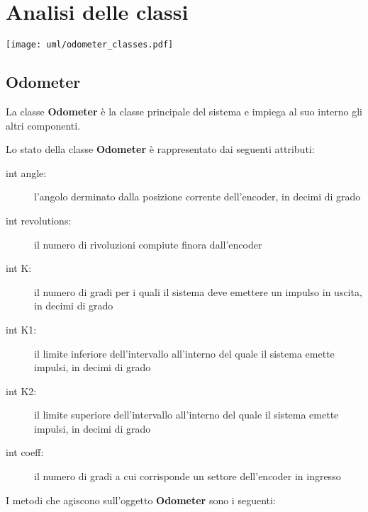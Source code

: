 \documentclass [11pt,a4paper,oneside]{article}
\newcommand{\component}[1]{\textbf{#1}}
\begin{document}
\section{Analisi delle classi}
\begin{center}
    \texttt{[image: uml/odometer\_classes.pdf]}
    \label{usecases}
\end{center}

\subsection{Odometer}
La classe \component{Odometer} è la classe principale del sistema e
impiega al suo interno gli altri componenti.

Lo stato della classe \component{Odometer} è rappresentato
dai seguenti attributi:

\begin{description}
\item[int angle:] l'angolo derminato dalla posizione corrente dell'encoder,
     in decimi di grado
\item[int revolutions:] il numero di rivoluzioni compiute finora dall'encoder
\item[int K:] il numero di gradi per i quali il sistema deve emettere un
     impulso in uscita, in decimi di grado
\item[int K1:] il limite inferiore dell'intervallo all'interno del quale
     il sistema emette impulsi, in decimi di grado
\item[int K2:] il limite superiore dell'intervallo all'interno del quale
     il sistema emette impulsi, in decimi di grado
\item[int coeff:] il numero di gradi a cui corrisponde un settore
     dell'encoder in ingresso
\end{description}

I metodi che agiscono sull'oggetto \component{Odometer} sono i seguenti:
\end{document}
